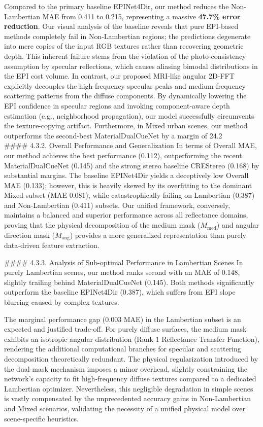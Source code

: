 \documentclass[journal]{IEEEtran}
\begin{document}
Compared to the primary baseline EPINet4Dir, our method reduces the Non-Lambertian MAE from 0.411 to 0.215, representing a massive \textbf{47.7\% error reduction}. Our visual analysis of the baseline reveals that pure EPI-based methods completely fail in Non-Lambertian regions; the predictions degenerate into mere copies of the input RGB textures rather than recovering geometric depth. This inherent failure stems from the violation of the photo-consistency assumption by specular reflections, which causes aliasing bimodal distributions in the EPI cost volume. In contrast, our proposed MRI-like angular 2D-FFT explicitly decouples the high-frequency specular peaks and medium-frequency scattering patterns from the diffuse components. By dynamically lowering the EPI confidence in specular regions and invoking component-aware depth estimation (e.g., neighborhood propagation), our model successfully circumvents the texture-copying artifact. Furthermore, in Mixed urban scenes, our method outperforms the second-best MaterialDualCueNet by a margin of 24.2\\%

\#\#\#\# 4.3.2. Overall Performance and Generalization
In terms of Overall MAE, our method achieves the best performance (0.112), outperforming the recent MaterialDualCueNet (0.145) and the strong stereo baseline CREStereo (0.168) by substantial margins. The baseline EPINet4Dir yields a deceptively low Overall MAE (0.133); however, this is heavily skewed by its overfitting to the dominant Mixed subset (MAE 0.081), while catastrophically failing on Lambertian (0.387) and Non-Lambertian (0.411) subsets. Our unified framework, conversely, maintains a balanced and superior performance across all reflectance domains, proving that the physical decomposition of the medium mask ($M_{\text{med}}$) and angular direction mask ($M_{\text{ang}}$) provides a more generalized representation than purely data-driven feature extraction.

\#\#\#\# 4.3.3. Analysis of Sub-optimal Performance in Lambertian Scenes
In purely Lambertian scenes, our method ranks second with an MAE of 0.148, slightly trailing behind MaterialDualCueNet (0.145). Both methods significantly outperform the baseline EPINet4Dir (0.387), which suffers from EPI slope blurring caused by complex textures. 

The marginal performance gap (0.003 MAE) in the Lambertian subset is an expected and justified trade-off. For purely diffuse surfaces, the medium mask exhibits an isotropic angular distribution (Rank-1 Reflectance Transfer Function), rendering the additional computational branches for specular and scattering decomposition theoretically redundant. The physical regularization introduced by the dual-mask mechanism imposes a minor overhead, slightly constraining the network's capacity to fit high-frequency diffuse textures compared to a dedicated Lambertian optimizer. Nevertheless, this negligible degradation in simple scenes is vastly compensated by the unprecedented accuracy gains in Non-Lambertian and Mixed scenarios, validating the necessity of a unified physical model over scene-specific heuristics.
\end{document}
